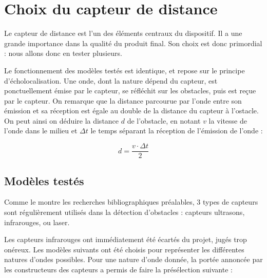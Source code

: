 \documentclass[a4paper, 11pt]{article}
\begin{document}

\newpage \section{Choix du capteur de distance}

\par Le capteur de distance est l'un des éléments centraux du dispositif. Il a une grande importance dans la qualité du produit final. Son choix est donc primordial : nous allons donc en tester plusieurs.

\par Le fonctionnement des modèles testés est identique, et repose sur le principe d'écholocalisation. Une onde, dont la nature dépend du capteur, est ponctuellement émise par le capteur, se réfléchit sur les obstacles, puis est reçue par le capteur. On remarque que la distance parcourue par l'onde entre son émission et sa réception est égale au double de la distance du capteur à l'ostacle. On peut ainsi on déduire la distance $d$ de l'obstacle, en notant $v$ la vitesse de l'onde dans le milieu et $\Delta t$ le temps séparant la réception de l'émission de l'onde :

\begin{equation}
d = \frac{v \cdot \Delta t}{2}
\end{equation}

\subsection{Modèles testés}

\par Comme le montre les recherches bibliographiques préalables, 3 types de capteurs sont régulièrement utilisés dans la détection d'obstacles : capteurs ultrasons, infrarouges, ou laser.

\par Les capteurs infrarouges ont immédiatement été écartés du projet, jugés trop onéreux. Les modèles suivants ont été choisis pour représenter les différentes natures d'ondes possibles. Pour une nature d'onde donnée, la portée annoncée par les constructeurs des capteurs a permis de faire la présélection suivante :
\end{document}

